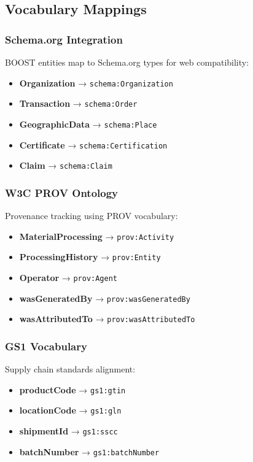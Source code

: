 \subsection{Vocabulary Mappings}
\label{sec:vocabulary-mappings}

\subsubsection{Schema.org Integration}

BOOST entities map to Schema.org types for web compatibility:

\begin{itemize}
    \item \textbf{Organization} → \texttt{schema:Organization}
    \item \textbf{Transaction} → \texttt{schema:Order}
    \item \textbf{GeographicData} → \texttt{schema:Place}
    \item \textbf{Certificate} → \texttt{schema:Certification}
    \item \textbf{Claim} → \texttt{schema:Claim}
\end{itemize}

\subsubsection{W3C PROV Ontology}

Provenance tracking using PROV vocabulary:

\begin{itemize}
    \item \textbf{MaterialProcessing} → \texttt{prov:Activity}
    \item \textbf{ProcessingHistory} → \texttt{prov:Entity}
    \item \textbf{Operator} → \texttt{prov:Agent}
    \item \textbf{wasGeneratedBy} → \texttt{prov:wasGeneratedBy}
    \item \textbf{wasAttributedTo} → \texttt{prov:wasAttributedTo}
\end{itemize}

\subsubsection{GS1 Vocabulary}

Supply chain standards alignment:

\begin{itemize}
    \item \textbf{productCode} → \texttt{gs1:gtin}
    \item \textbf{locationCode} → \texttt{gs1:gln}
    \item \textbf{shipmentId} → \texttt{gs1:sscc}
    \item \textbf{batchNumber} → \texttt{gs1:batchNumber}
\end{itemize}

